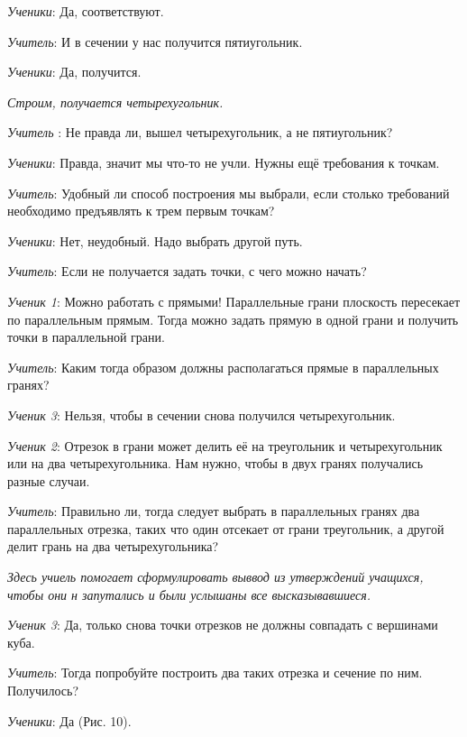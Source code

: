 \documentclass[a4paper,14pt,russian]{extreport}
\newcommand{\capt}[1]{%
    \\[8pt]
    \text{Рис. #1}
}
\begin{document}
\textit{Ученики}: Да, соответствуют.

\textit{Учитель}: И в сечении у нас получится пятиугольник.

\textit{Ученики}: Да, получится.

\textit{Строим, получается четырехугольник.}

\textit{Учитель} : Не правда ли, вышел четырехугольник, а не пятиугольник?

\textit{Ученики}: Правда, значит мы что-то не учли. Нужны ещё требования к точкам.

\textit{Учитель}: Удобный ли способ построения мы выбрали, если столько требований необходимо предъявлять к трем первым точкам?

\textit{Ученики}: Нет, неудобный. Надо выбрать другой путь.

\textit{Учитель}: Если не получается задать точки, с чего можно начать?

\textit{Ученик 1}: Можно работать с прямыми! Параллельные грани плоскость пересекает по параллельным прямым. Тогда можно задать прямую в одной грани и получить точки в параллельной грани.

\textit{Учитель}: Каким тогда образом должны располагаться прямые в параллельных гранях?

\textit{Ученик 3}: Нельзя, чтобы в сечении снова получился четырехугольник.

\textit{Ученик 2}: Отрезок в грани может делить её на треугольник и четырехугольник или на два четырехугольника. Нам нужно, чтобы в двух гранях получались разные случаи.

\textit{Учитель}: Правильно ли, тогда следует выбрать в параллельных гранях два параллельных отрезка, таких что один отсекает от грани треугольник, а другой делит грань на два четырехугольника?

\textit{Здесь учиель помогает сформулировать выввод из утверждений учащихся, чтобы они н запутались и были услышаны все высказывавшиеся.}

\textit{Ученик 3}: Да, только снова точки отрезков не должны совпадать с вершинами куба.

\textit{Учитель}: Тогда попробуйте построить два таких отрезка и сечение по ним. Получилось?

\textit{Ученики}: Да (Рис. 10).

\begin{center}
    \begin{minipage}{0.3\textwidth}
        \centering
    \end{minipage}
    \capt{10}
\end{center}
\end{document}

